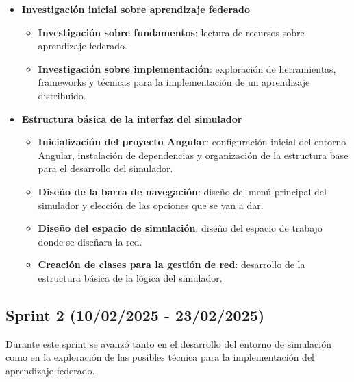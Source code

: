 \begin{itemize}
    \item \textbf{Investigación inicial sobre aprendizaje federado}
    \begin{itemize}
        \item \textbf{Investigación sobre fundamentos}: lectura de recursos sobre aprendizaje federado.
        \item \textbf{Investigación sobre implementación}: exploración de herramientas, frameworks y técnicas para la implementación de un aprendizaje distribuido.
    \end{itemize}
    \item \textbf{Estructura básica de la interfaz del simulador}
    \begin{itemize}
        \item \textbf{Inicialización del proyecto Angular}: configuración inicial del entorno Angular, instalación de dependencias y organización de la estructura base para el desarrollo del simulador.
        \item \textbf{Diseño de la barra de navegación}: diseño del menú principal del simulador y elección de las opciones que se van a dar.
        \item \textbf{Diseño del espacio de simulación}: diseño del espacio de trabajo donde se diseñara la red.
        \item \textbf{Creación de clases para la gestión de red}: desarrollo de la estructura básica de la lógica del simulador.
    \end{itemize}
\end{itemize}

\subsection{Sprint 2 (10/02/2025 - 23/02/2025)}
\label{subsec:SegundoSprint}
Durante este sprint se avanzó tanto en el desarrollo del entorno de simulación como en la exploración de las posibles técnica para la implementación del aprendizaje federado.

